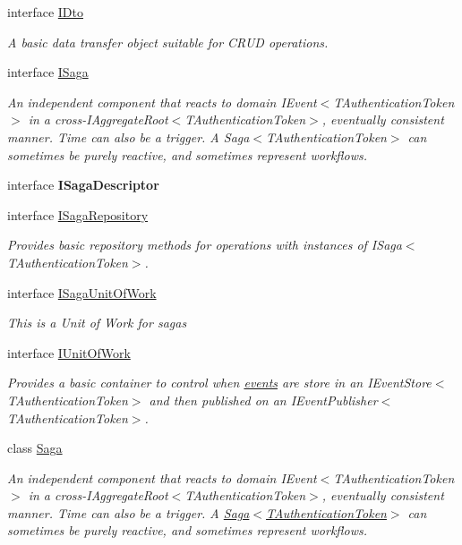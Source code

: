 \begin{DoxyCompactItemize}
interface \hyperlink{interfaceCqrs_1_1Domain_1_1IDto}{I\+Dto}
\begin{DoxyCompactList}\small\item\em A basic data transfer object suitable for C\+R\+UD operations. \end{DoxyCompactList}\item 
interface \hyperlink{interfaceCqrs_1_1Domain_1_1ISaga}{I\+Saga}
\begin{DoxyCompactList}\small\item\em An independent component that reacts to domain I\+Event$<$\+T\+Authentication\+Token$>$ in a cross-\/I\+Aggregate\+Root$<$\+T\+Authentication\+Token$>$, eventually consistent manner. Time can also be a trigger. A Saga$<$\+T\+Authentication\+Token$>$ can sometimes be purely reactive, and sometimes represent workflows. \end{DoxyCompactList}\item 
interface {\bfseries I\+Saga\+Descriptor}
\item 
interface \hyperlink{interfaceCqrs_1_1Domain_1_1ISagaRepository}{I\+Saga\+Repository}
\begin{DoxyCompactList}\small\item\em Provides basic repository methods for operations with instances of I\+Saga$<$\+T\+Authentication\+Token$>$. \end{DoxyCompactList}\item 
interface \hyperlink{interfaceCqrs_1_1Domain_1_1ISagaUnitOfWork}{I\+Saga\+Unit\+Of\+Work}
\begin{DoxyCompactList}\small\item\em This is a Unit of Work for sagas \end{DoxyCompactList}\item 
interface \hyperlink{interfaceCqrs_1_1Domain_1_1IUnitOfWork}{I\+Unit\+Of\+Work}
\begin{DoxyCompactList}\small\item\em Provides a basic container to control when \hyperlink{}{events} are store in an I\+Event\+Store$<$\+T\+Authentication\+Token$>$ and then published on an I\+Event\+Publisher$<$\+T\+Authentication\+Token$>$. \end{DoxyCompactList}\item 
class \hyperlink{classCqrs_1_1Domain_1_1Saga}{Saga}
\begin{DoxyCompactList}\small\item\em An independent component that reacts to domain I\+Event$<$\+T\+Authentication\+Token$>$ in a cross-\/I\+Aggregate\+Root$<$\+T\+Authentication\+Token$>$, eventually consistent manner. Time can also be a trigger. A \hyperlink{classCqrs_1_1Domain_1_1Saga_a1b6019cecbbf2572b64dd456cb5d91a2_a1b6019cecbbf2572b64dd456cb5d91a2}{Saga$<$\+T\+Authentication\+Token$>$} can sometimes be purely reactive, and sometimes represent workflows. \end{DoxyCompactList}\item 

\end{DoxyCompactItemize}
